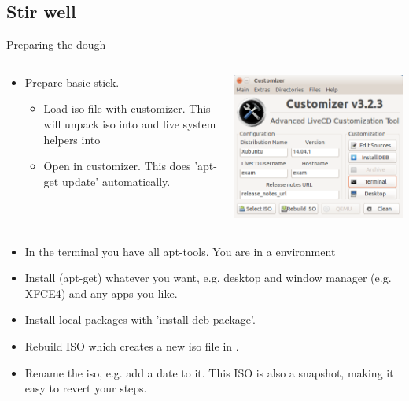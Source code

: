 \subsection[Stir well]{Stir well}
\begin{frame}{Preparing the dough}
  \begin{columns}
    \begin{column}{.6\textwidth}
      \begin{itemize}
      \item Prepare basic stick.
        \begin{itemize}
        \item Load iso file with customizer. This will unpack iso into
           and live system helpers into 
        \item Open  in customizer. This does 'apt-get
          update' automatically. 
        \end{itemize}
      \end{itemize}
    \end{column}
    \begin{column}{.4\textwidth}
      \includegraphics[width=\textwidth]{figures/customizer.png}
    \end{column}
  \end{columns}
  \begin{itemize}
  \item In the terminal you have all apt-tools. You are in a  environment
  \item Install (apt-get) whatever you want, e.g. desktop and window manager
    (e.g. XFCE4) and any apps you like.
  \item Install local  packages with 'install deb
    package'.
  \item Rebuild ISO which creates a new iso file in .
  \item Rename the iso, e.g. add a date to it. This ISO is also a
    snapshot, making it easy to revert your steps.
  \end{itemize}
\end{frame}

